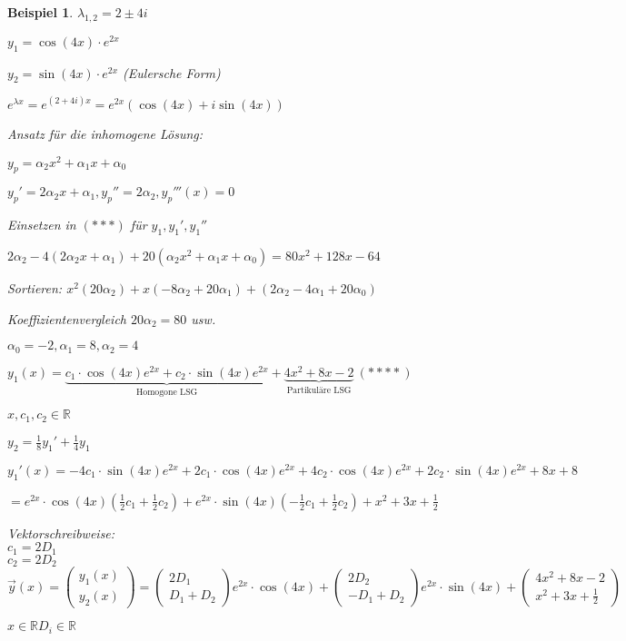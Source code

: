 \documentclass[fontset=ubuntu,12pt,a4paper]{scrreprt}
\newtheorem{beispiel}[defi]{Beispiel}
\begin{document}
\begin{beispiel}
        \(\lambda_{1,2}=2\pm4i\)

        \(y_1=\cos(4x)\cdot e^{2x}\)

        \(y_2=\sin(4x)\cdot e^{2x}\) (Eulersche Form)

        \(e^{\lambda x}=e^{(2+4i)x}=e^{2x}(\cos(4x)+i\sin(4x)) \)

        Ansatz für die inhomogene Lösung:

        \(y_p=\alpha_2x^2+\alpha_1x+\alpha_0 \)

        \(y_p'=2\alpha_2x+\alpha_1, y_p''=2\alpha_2, y_p'''(x)=0 \)

        Einsetzen in \((***)\) für \(y_1, y_1', y_1''\)
        
        \(2\alpha_2-4(2\alpha_2x+\alpha_1)+20(\alpha_2x^2+\alpha_1x+\alpha_0) = 80x^2+128x-64\)

        Sortieren: \(x^2(20\alpha_2)+x(-8\alpha_2+20\alpha_1)+(2\alpha_2-4\alpha_1+20\alpha_0)\)

        Koeffizientenvergleich \(20\alpha_2 = 80 \) usw.

        \(\alpha_0=-2, \alpha_1=8, \alpha_2=4  \)
        
        \( y_1(x)=\underbrace{c_1\cdot\cos(4x)e^{2x}+c_2\cdot\sin(4x)e^{2x}}_{\text{Homogone LSG}}+\underbrace{4x^2+8x-2}_{\text{Partikuläre LSG}}\ (****) \)
        
        \(x,c_1,c_2\in\mathbb{R}\)

        \(y_2=\frac{1}{8}y_1'+\frac{1}{4}y_1\)

        \(y_1'(x)=-4c_1\cdot\sin(4x)e^{2x}+2c_1\cdot\cos(4x)e^{2x}+4c_2\cdot\cos(4x)e^{2x}+2c_2\cdot\sin(4x)e^{2x}+8x+8 \)

        \(=e^{2x}\cdot\cos(4x)(\frac{1}{2}c_1+\frac{1}{2}c_2)+e^{2x}\cdot\sin(4x)(-\frac{1}{2}c_1+\frac{1}{2}c_2)+x^2+3x+\frac{1}{2} \)

        Vektorschreibweise: \\
        \(c_1=2D_1\) \\
        \(c_2=2D_2\) \\
        \( \vec{y}(x)=\begin{pmatrix}y_1(x) \\ y_2(x)\end{pmatrix} = \begin{pmatrix}2D_1 \\ D_1+D_2\end{pmatrix} e^{2x}\cdot\cos(4x)+\begin{pmatrix}2D_2 \\ -D_1+D_2\end{pmatrix}e^{2x}\cdot\sin(4x) + \begin{pmatrix}4x^2+8x-2 \\ x^2+3x +\frac{1}{2} \end{pmatrix} \)
        
        \(x\in\mathbb{R} D_i\in\mathbb{R}\)
     \end{beispiel}
\end{document}
